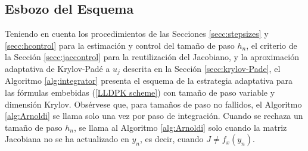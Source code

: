 \subsection{Esbozo del Esquema}

Teniendo en cuenta los procedimientos de las Secciones \ref{secc:stepsizes} y \ref{secc:hcontrol} para la estimación y control del tamaño de paso $h_n$, el criterio de la Sección \ref{secc:jaccontrol} para la reutilización del Jacobiano, y la aproximación adaptativa de Krylov-Padé a $u_j$ descrita en la Sección \ref{secc:krylov-Pade}, el Algoritmo \ref{alg:integrator} presenta el esquema de la estrategia adaptativa para las fórmulas embebidas  (\ref{LLDPK scheme}) con tamaño de paso variable y dimensión Krylov. Obsérvese que, para tamaños de paso no fallidos, el Algoritmo \ref{alg:Arnoldi} se llama solo una vez por paso de integración. Cuando se rechaza un tamaño de paso $h_n$, se llama al Algoritmo \ref{alg:Arnoldi} solo cuando la matriz Jacobiana no se ha actualizado en $y_n$, es decir, cuando $J \neq f_x(y_n)$.


